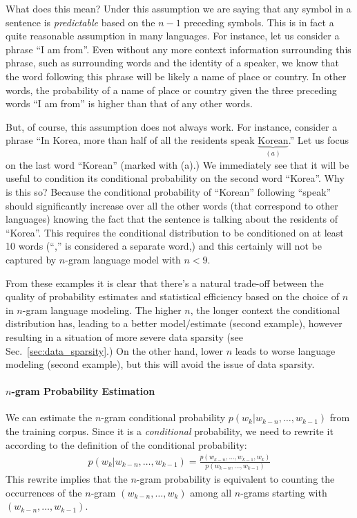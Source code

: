 \documentclass{report}
\begin{document}
What does this mean? Under this assumption we are saying that any symbol in a
sentence is {\em predictable} based on the $n-1$ preceding symbols. This is in
fact a quite reasonable assumption in many languages. For instance, let us
consider a phrase ``I am from''. Even without any more context information
surrounding this phrase, such as surrounding words and the identity of a
speaker, we know that the word following this phrase will be likely a name of
place or country. In other words, the probability of a name of place or country
given the three preceding words ``I am from'' is higher than that of any other
words. 

But, of course, this assumption does not always work. For instance, consider a
phrase ``In Korea, more than half of all the residents speak
$\underbrace{\text{Korean}}_{(a)}$.'' Let us focus on the last word ``Korean''
(marked with (a).) We immediately see that it will be useful to condition its
conditional probability on the second word ``Korea''. Why is this so? Because
the conditional probability of ``Korean'' following ``speak'' should
significantly increase over all the other words (that correspond to other
languages) knowing the fact that the sentence is talking about the residents of
``Korea''. This requires the conditional distribution to be conditioned on at
least 10 words (``,'' is considered a separate word,) and this certainly will
not be captured by $n$-gram language model with $n < 9$.  

From these examples it is clear that there's a natural trade-off between the
quality of probability estimates and statistical efficiency based on the choice
of $n$ in $n$-gram language modeling. The higher $n$, the longer context the
conditional distribution has, leading to a better model/estimate (second
example), however resulting in a situation of more severe data sparsity (see
Sec.~\ref{sec:data_sparsity}.) On the other hand, lower $n$ leads to
worse language modeling (second example), but this will avoid the issue of data
sparsity. 

\paragraph{$n$-gram Probability Estimation}

We can estimate the $n$-gram conditional probability $p(w_k | w_{k-n}, \ldots,
w_{k-1})$ from the training corpus.
Since it is a
{\em conditional} probability, we need to rewrite it according to the definition
of the conditional probability:
\begin{align}
    \label{eq:n_gram_prob}
    p(w_k | w_{k-n}, \ldots, w_{k-1}) = \frac{p(
    w_{k-n}, \ldots, w_{k-1}, w_k)}
    {p(w_{k-n}, \ldots, w_{k-1})}
\end{align}
This rewrite implies that the $n$-gram probability is equivalent to counting
the occurrences of the $n$-gram $(w_{k-n}, \ldots, w_{k})$
among all $n$-grams starting with $(w_{k-n}, \ldots, w_{k-1})$.
\end{document}

